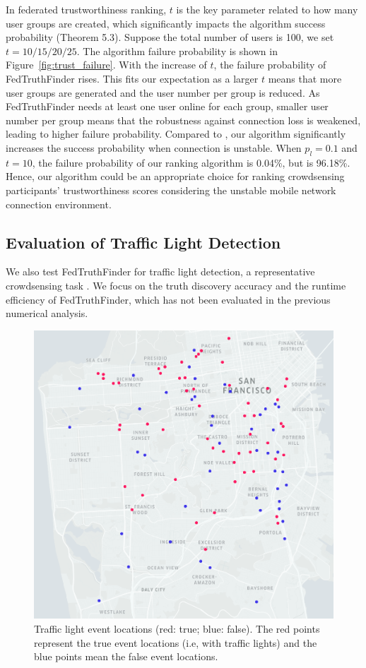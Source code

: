 \documentclass[11pt]{article}
\begin{document}
In federated trustworthiness ranking, $t$ is the key parameter related to how many user groups are created, which significantly impacts the algorithm success probability (Theorem 5.3). Suppose the total number of users is 100, we set $t=10/15/20/25$. The algorithm failure probability is shown in Figure~\ref{fig:trust_failure}. With the increase of $t$, the failure probability of FedTruthFinder rises. This fits our expectation as a larger $t$ means that more user groups are generated and the user number per group is reduced. As FedTruthFinder needs at least one user online for each group, smaller user number per group means that the robustness against connection loss is weakened, leading to higher failure probability. Compared to \cite{Leye-tang2011secure}, our algorithm significantly increases the success probability when connection is unstable. When $p_l = 0.1$ and $t=10$, the failure probability of our ranking algorithm is 0.04\%, but \cite{Leye-tang2011secure} is 96.18\%.
Hence, our algorithm could be an appropriate choice for ranking crowdsensing participants' trustworthiness scores considering the unstable mobile network connection environment.



\subsection{Evaluation of Traffic Light Detection}

We also test FedTruthFinder for traffic light detection, a representative crowdsensing task \cite{Leye-ouyang2015truth,Leye-wang2013credibility}. We focus on the truth discovery accuracy and the runtime efficiency of FedTruthFinder, which has not been evaluated in the previous numerical analysis.


\begin{figure}[t]
	\centering
	\includegraphics[width=.8\linewidth]{submissions/LeyeWang/fig/traffic_light_map.png}
	\caption{Traffic light event locations (red: true; blue: false). The red points represent the true event locations (i.e, with traffic lights) and the blue points mean the false event locations.}
	\label{fig:traffic_light_map}
\end{figure}
\end{document}
